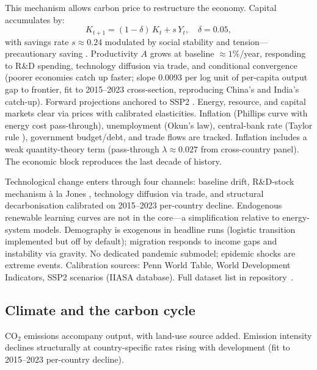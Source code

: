 \documentclass[a4paper,fleqn]{cas-sc}
\begin{document}
This mechanism allows carbon price to restructure the economy. Capital accumulates by:
\begin{equation}
K_{t+1} = (1-\delta)\,K_t + s\,Y_t, \quad \delta = 0.05,
\label{eq:capital}
\end{equation}
with savings rate $s\approx0.24$ modulated by social stability and tension---precautionary saving \citep{mody2012}. Productivity $A$ grows at baseline ${\approx}1\%$/year, responding to R\&D spending, technology diffusion via trade, and conditional convergence (poorer economies catch up faster; slope 0.0093 per log unit of per-capita output gap to frontier, fit to 2015--2023 cross-section, reproducing China's and India's catch-up). Forward projections anchored to SSP2 \citep{riahi2017}. Energy, resource, and capital markets clear via prices with calibrated elasticities. Inflation (Phillips curve with energy cost pass-through), unemployment (Okun's law), central-bank rate (Taylor rule \citep{taylor1993}), government budget/debt, and trade flows are tracked. Inflation includes a weak quantity-theory term (pass-through $\lambda\approx0.027$ from cross-country panel). The economic block reproduces the last decade of history.

Technological change enters through four channels: baseline drift, R\&D-stock mechanism \`a la Jones \citep{jones1995}, technology diffusion via trade, and structural decarbonisation calibrated on 2015--2023 per-country decline. Endogenous renewable learning curves are not in the core---a simplification relative to energy-system models. Demography is exogenous in headline runs (logistic transition implemented but off by default); migration responds to income gaps and instability via gravity. No dedicated pandemic submodel; epidemic shocks are extreme events. Calibration sources: Penn World Table, World Development Indicators, SSP2 scenarios (IIASA database). Full dataset list in repository~\citep{theclimateguy2026gim}.

\subsection{Climate and the carbon cycle}

CO$_2$ emissions accompany output, with land-use source added. Emission intensity declines structurally at country-specific rates rising with development (fit to 2015--2023 per-country decline).
\end{document}
